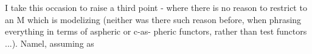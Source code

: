 I take this occasion to raise a third point - where there is no
reason to restrict to an M which is modelizing (neither was there such
reason before, when phrasing everything in terms of aspheric or c-as-%
pheric functors, rather than test functors ...). Namel, assuming as

